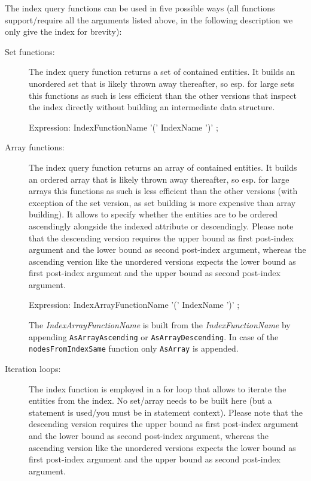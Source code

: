 The index query functions can be used in five possible ways (all functions support/require all the arguments listed above, in the following description we only give the index for brevity): 
\begin{description}
	\item[Set functions:] The index query function returns a set of contained entities. It builds an unordered set that is likely thrown away thereafter, so esp. for large sets this functions as such is less efficient than the other versions that inspect the index directly without building an intermediate data structure.
\begin{rail}
Expression:
  IndexFunctionName '(' IndexName ')' ;
\end{rail}

	\item[Array functions:] The index query function returns an array of contained entities. It builds an ordered array that is likely thrown away thereafter, so esp. for large arrays this functions as such is less efficient than the other versions (with exception of the set version, as set building is more expensive than array building). It allows to specify whether the entities are to be ordered ascendingly alongside the indexed attribute or descendingly.
Please note that the descending version requires the upper bound as first post-index argument and the lower bound as second post-index argument, whereas the ascending version like the unordered versions expects the lower bound as first post-index argument and the upper bound as second post-index argument.
\begin{rail}
Expression:
  IndexArrayFunctionName '(' IndexName ')' ;
\end{rail}
The \emph{IndexArrayFunctionName} is built from the \emph{IndexFunctionName} by appending \texttt{AsArrayAscending} or \texttt{AsArrayDescending}.
In case of the \texttt{nodesFromIndexSame} function only \texttt{AsArray} is appended.

	\item[Iteration loops:] The index function is employed in a for loop that allows to iterate the entities from the index. No set/array needs to be built here (but a statement is used/you must be in statement context).
Please note that the descending version requires the upper bound as first post-index argument and the lower bound as second post-index argument, whereas the ascending version like the unordered versions expects the lower bound as first post-index argument and the upper bound as second post-index argument.


\end{description}
